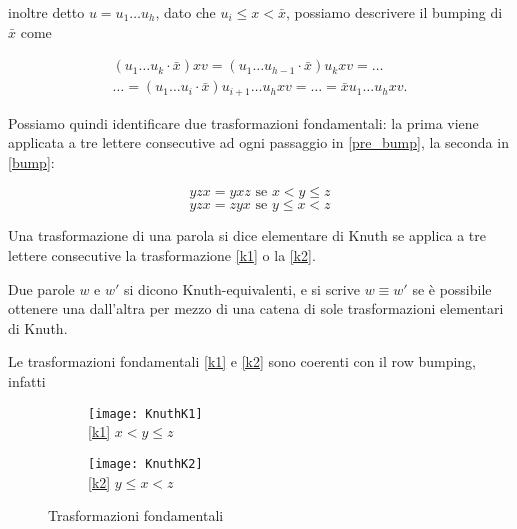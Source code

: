 inoltre detto $u=u_1 \ldots u_h$, dato che $u_i \leq x < \bar x$, possiamo
descrivere il bumping di $\bar x$ come

\begin{equation}\label{bump}
\begin{split}
(u_1 \ldots u_k \cdot \bar x) x v
= (u_1 \ldots u_{h-1} \cdot \bar x) u_k x v = \ldots\\
\ldots =  (u_1 \ldots u_i \cdot \bar x
)u_{i+1} \ldots u_h x v = \ldots
= \bar x u_1 \ldots u_h x v.
\end{split}
\end{equation}

Possiamo quindi identificare due trasformazioni fondamentali: la prima
viene applicata a tre lettere consecutive ad ogni passaggio in \eqref{pre_bump}, la seconda
in \eqref{bump}:

\begin{equation}\label{k1}\tag{$K_1$}
y z x = y x z \mbox{ se } x < y
\leq z
\end{equation}
\begin{equation}\label{k2}\tag{$K_2$}
y z x = z y x \mbox{ se } y
\leq x < z
\end{equation}

\begin{defn}
Una trasformazione di una parola si dice elementare di Knuth se
applica a tre lettere consecutive la trasformazione \eqref{k1} o la
\eqref{k2}.
\end{defn}

\begin{defn}
Due parole $w$ e $w'$ si dicono Knuth-equivalenti, e si scrive $w
\equiv w'$ se \`e possibile ottenere una dall'altra per mezzo di una catena di
sole trasformazioni elementari di Knuth.
\end{defn}
\begin{oss}
Le trasformazioni fondamentali \eqref{k1} e \eqref{k2} sono coerenti
con il row bumping, infatti

\begin{figure}[h]
\centering
\begin{subfigure}[b]{0.3\textwidth}
\centering
\texttt{[image: KnuthK1]}\\
\eqref{k1} $x < y \leq z$
\end{subfigure}%
\begin{subfigure}[b]{0.3\textwidth}
\centering
\texttt{[image: KnuthK2]}\\
\eqref{k2} $y \leq x < z$
\end{subfigure}
\caption{Trasformazioni fondamentali}
\end{figure}
\end{oss}
\FloatBarrier

